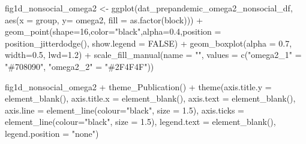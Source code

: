 \documentclass[
]{article}
\newenvironment{Shaded}{\begin{snugshade}}{\end{snugshade}}
\newcommand{\AttributeTok}[1]{\textcolor[rgb]{0.77,0.63,0.00}{#1}}
\newcommand{\ConstantTok}[1]{\textcolor[rgb]{0.00,0.00,0.00}{#1}}
\newcommand{\DecValTok}[1]{\textcolor[rgb]{0.00,0.00,0.81}{#1}}
\newcommand{\FloatTok}[1]{\textcolor[rgb]{0.00,0.00,0.81}{#1}}
\newcommand{\FunctionTok}[1]{\textcolor[rgb]{0.00,0.00,0.00}{#1}}
\newcommand{\NormalTok}[1]{#1}
\newcommand{\OtherTok}[1]{\textcolor[rgb]{0.56,0.35,0.01}{#1}}
\newcommand{\SpecialCharTok}[1]{\textcolor[rgb]{0.00,0.00,0.00}{#1}}
\newcommand{\StringTok}[1]{\textcolor[rgb]{0.31,0.60,0.02}{#1}}
\begin{document}
\begin{Shaded}
\begin{Highlighting}[]
\NormalTok{fig1d\_nonsocial\_omega2 }\OtherTok{\textless{}{-}} \FunctionTok{ggplot}\NormalTok{(dat\_prepandemic\_omega2\_nonsocial\_df, }\FunctionTok{aes}\NormalTok{(}\AttributeTok{x =}\NormalTok{ group,}
                                                                          \AttributeTok{y=}\NormalTok{ omega2,}
                                                                          \AttributeTok{fill =} \FunctionTok{as.factor}\NormalTok{(block))) }\SpecialCharTok{+}
  \FunctionTok{geom\_point}\NormalTok{(}\AttributeTok{shape=}\DecValTok{16}\NormalTok{,}\AttributeTok{color=}\StringTok{"black"}\NormalTok{,}\AttributeTok{alpha=}\FloatTok{0.4}\NormalTok{,}\AttributeTok{position =} \FunctionTok{position\_jitterdodge}\NormalTok{(), }\AttributeTok{show.legend =} \ConstantTok{FALSE}\NormalTok{) }\SpecialCharTok{+} 
  \FunctionTok{geom\_boxplot}\NormalTok{(}\AttributeTok{alpha =} \FloatTok{0.7}\NormalTok{, }\AttributeTok{width=}\FloatTok{0.5}\NormalTok{, }\AttributeTok{lwd=}\FloatTok{1.2}\NormalTok{) }\SpecialCharTok{+}
  \FunctionTok{scale\_fill\_manual}\NormalTok{(}\AttributeTok{name =} \StringTok{""}\NormalTok{, }
                    \AttributeTok{values =} \FunctionTok{c}\NormalTok{(}\StringTok{"omega2\_1"} \OtherTok{=} \StringTok{"\#708090"}\NormalTok{, }\StringTok{"omega2\_2"} \OtherTok{=} \StringTok{"\#2F4F4F"}\NormalTok{))}


\NormalTok{fig1d\_nonsocial\_omega2 }\SpecialCharTok{+} \FunctionTok{theme\_Publication}\NormalTok{() }\SpecialCharTok{+} \FunctionTok{theme}\NormalTok{(}\AttributeTok{axis.title.y =} \FunctionTok{element\_blank}\NormalTok{(),}
                                                     \AttributeTok{axis.title.x =} \FunctionTok{element\_blank}\NormalTok{(),}
                                                     \AttributeTok{axis.text =} \FunctionTok{element\_blank}\NormalTok{(), }
                                                     \AttributeTok{axis.line =} \FunctionTok{element\_line}\NormalTok{(}\AttributeTok{colour=}\StringTok{"black"}\NormalTok{, }\AttributeTok{size =} \FloatTok{1.5}\NormalTok{),}
                                                     \AttributeTok{axis.ticks =} \FunctionTok{element\_line}\NormalTok{(}\AttributeTok{colour=}\StringTok{"black"}\NormalTok{, }\AttributeTok{size =} \FloatTok{1.5}\NormalTok{),}
                                                     \AttributeTok{legend.text =} \FunctionTok{element\_blank}\NormalTok{(),}
                                                     \AttributeTok{legend.position =} \StringTok{"none"}\NormalTok{)}
\end{Highlighting}
\end{Shaded}
\end{document}
